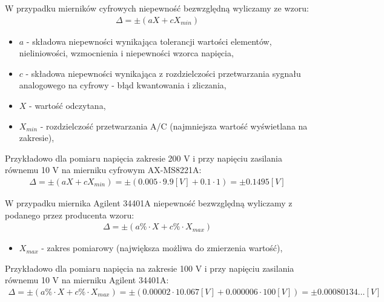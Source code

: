 \documentclass[11pt]{article}
\begin{document}
    \par{\noindent
        W przypadku mierników cyfrowych niepewność bezwzględną wyliczamy ze wzoru:
    }
    \begin{gather}
        \Delta=\pm(aX+cX_{min})
    \end{gather}
    {\footnotesize
    \begin{itemize}
              \setlength\itemsep{0em}
              \item[] \boldmath$a$ - składowa niepewności wynikająca tolerancji wartości elementów, nieliniowości, wzmocnienia i niepewności wzorca napięcia,
              \item[] \boldmath$c$ - składowa niepewności wynikająca z rozdzielczości przetwarzania sygnału analogowego na cyfrowy - błąd kwantowania i zliczania,
              \item[] \boldmath$X$ - wartość odczytana,
              \item[] \boldmath$X_{min}$ - rozdzielczość przetwarzania A/C (najmniejsza wartość wyświetlana na zakresie),
    \end{itemize}}
    \par{\noindent
    Przykładowo dla pomiaru napięcia zakresie 200 V i przy napięciu zasilania równemu
    10 V na mierniku cyfrowym AX-MS8221A:
    }
    \begin{gather}
        \Delta=\pm(aX+cX_{min})=\pm(0.005\cdot 9.9[V]+0.1\cdot 1)=\pm 0.1495[V]
    \end{gather}
    \par{
        W przypadku miernika Agilent 34401A niepewność bezwzględną wyliczamy z podanego przez producenta wzoru:
    }
    \begin{gather}
        \Delta=\pm(a\%\cdot X+c\%\cdot X_{max})
    \end{gather}
    {\footnotesize
        \begin{itemize}
            \setlength\itemsep{0em}
            \item[] \boldmath$X_{max}$ - zakres pomiarowy (największa możliwa do zmierzenia wartość),
        \end{itemize}}
    \par{
    Przykładowo dla pomiaru napięcia na zakresie 100 V i przy napięciu zasilania równemu 10 V na mierniku Agilent 34401A:
    }
    \begin{gather}
        \Delta=\pm(a\%\cdot X+c\%\cdot X_{max})=\pm(0.00002\cdot 10.067[V]+0.000006\cdot 100[V])=\pm 0.00080134\dots [V]
    \end{gather}
\end{document}
